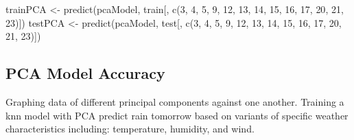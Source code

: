 \documentclass[
]{article}
\newenvironment{Shaded}{\begin{snugshade}}{\end{snugshade}}
\newcommand{\DecValTok}[1]{\textcolor[rgb]{0.00,0.00,0.81}{#1}}
\newcommand{\FunctionTok}[1]{\textcolor[rgb]{0.00,0.00,0.00}{#1}}
\newcommand{\NormalTok}[1]{#1}
\newcommand{\OtherTok}[1]{\textcolor[rgb]{0.56,0.35,0.01}{#1}}
\begin{document}
\begin{Shaded}
\begin{Highlighting}[]
\NormalTok{trainPCA }\OtherTok{\textless{}{-}} \FunctionTok{predict}\NormalTok{(pcaModel, train[, }\FunctionTok{c}\NormalTok{(}\DecValTok{3}\NormalTok{, }\DecValTok{4}\NormalTok{, }\DecValTok{5}\NormalTok{, }\DecValTok{9}\NormalTok{, }\DecValTok{12}\NormalTok{, }\DecValTok{13}\NormalTok{, }\DecValTok{14}\NormalTok{, }\DecValTok{15}\NormalTok{, }\DecValTok{16}\NormalTok{, }\DecValTok{17}\NormalTok{, }\DecValTok{20}\NormalTok{, }\DecValTok{21}\NormalTok{, }\DecValTok{23}\NormalTok{)])}
\NormalTok{testPCA }\OtherTok{\textless{}{-}} \FunctionTok{predict}\NormalTok{(pcaModel,  test[, }\FunctionTok{c}\NormalTok{(}\DecValTok{3}\NormalTok{, }\DecValTok{4}\NormalTok{, }\DecValTok{5}\NormalTok{, }\DecValTok{9}\NormalTok{, }\DecValTok{12}\NormalTok{, }\DecValTok{13}\NormalTok{, }\DecValTok{14}\NormalTok{, }\DecValTok{15}\NormalTok{, }\DecValTok{16}\NormalTok{, }\DecValTok{17}\NormalTok{, }\DecValTok{20}\NormalTok{, }\DecValTok{21}\NormalTok{, }\DecValTok{23}\NormalTok{)])}
\end{Highlighting}
\end{Shaded}

\hypertarget{pca-model-accuracy}{%
\subsection{PCA Model Accuracy}\label{pca-model-accuracy}}

Graphing data of different principal components against one another.
Training a knn model with PCA predict rain tomorrow based on variants of
specific weather characteristics including: temperature, humidity, and
wind.
\end{document}
